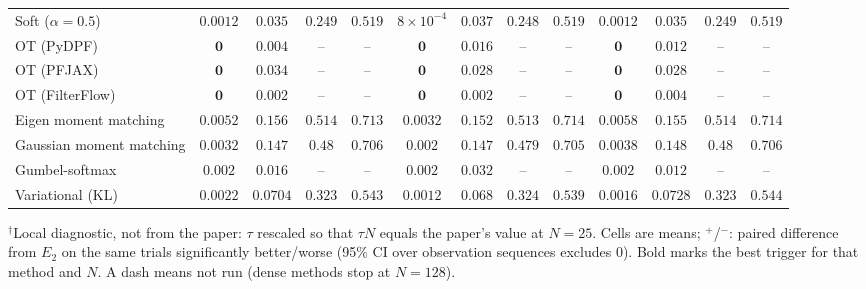 \begin{table}[ht]
\begin{adjustbox}{max width=\linewidth}
\begin{tabular}{lcccc|cccc|cccc}
Soft ($\alpha{=}0.5$) & $\mathbf{0.0012}$ & $0.035$ & $\mathbf{0.249}$ & $\mathbf{0.519}$ & $8\times10^{-4}$ & $\mathbf{0.037}$ & $0.248$ & $\mathbf{0.519}$ & $\mathbf{0.0012}$ & $0.035$ & $\mathbf{0.249}$ & $\mathbf{0.519}$ \\
OT (PyDPF) & $\mathbf{0}$ & $0.004$ & -- & -- & $\mathbf{0}$ & $\mathbf{0.016}$ & -- & -- & $\mathbf{0}$ & $0.012$ & -- & -- \\
OT (PFJAX) & $\mathbf{0}$ & $\mathbf{0.034}$ & -- & -- & $\mathbf{0}$ & $0.028$ & -- & -- & $\mathbf{0}$ & $0.028$ & -- & -- \\
OT (FilterFlow) & $\mathbf{0}$ & $0.002$ & -- & -- & $\mathbf{0}$ & $0.002$ & -- & -- & $\mathbf{0}$ & $\mathbf{0.004}$ & -- & -- \\
Eigen moment matching & $0.0052$ & $\mathbf{0.156}$ & $\mathbf{0.514}$ & $0.713$ & $0.0032$ & $0.152$ & $0.513$ & $\mathbf{0.714}$ & $\mathbf{0.0058}$ & $0.155$ & $0.514$ & $\mathbf{0.714}$ \\
Gaussian moment matching & $0.0032$ & $0.147$ & $\mathbf{0.48}$ & $\mathbf{0.706}$ & $0.002$ & $0.147$ & $0.479$ & $0.705$ & $\mathbf{0.0038}$ & $\mathbf{0.148}$ & $0.48$ & $\mathbf{0.706}$ \\
Gumbel-softmax & $\mathbf{0.002}$ & $0.016$ & -- & -- & $\mathbf{0.002}$ & $\mathbf{0.032}$ & -- & -- & $\mathbf{0.002}$ & $0.012$ & -- & -- \\
Variational (KL) & $\mathbf{0.0022}$ & $0.0704$ & $0.323$ & $0.543$ & $0.0012$ & $0.068$ & $\mathbf{0.324}$ & $0.539$ & $0.0016$ & $\mathbf{0.0728}$ & $0.323$ & $\mathbf{0.544}$ \\
\bottomrule
\end{tabular}
\end{adjustbox}
\par\smallskip\parbox{0.95\linewidth}{\footnotesize $^\dagger$Local diagnostic, not from the paper: $\tau$ rescaled so that $\tau N$ equals the paper's value at $N{=}25$. Cells are means; $^{+}$/$^{-}$: paired difference from $E_2$ on the same trials significantly better/worse (95\% CI over observation sequences excludes 0). Bold marks the best trigger for that method and $N$. A dash means not run (dense methods stop at $N{=}128$).}
\end{table}


